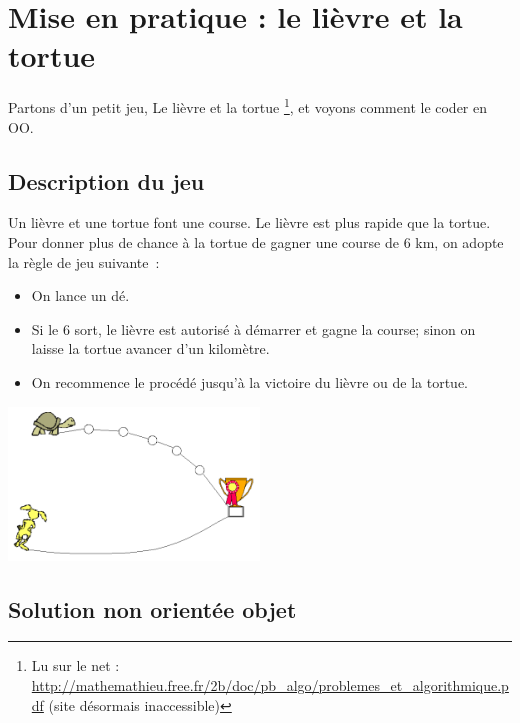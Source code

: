 \clearpage	
\section{Mise en pratique : le lièvre et la tortue}

	Partons d'un petit jeu, \og{}Le lièvre et la tortue\fg{}%
	\footnote{%
		Lu sur le net : 
		\url{http://mathemathieu.free.fr/2b/doc/pb_algo/problemes_et_algorithmique.pdf} (site désormais inaccessible)%
	}, 
	et voyons comment le coder en OO.

	\subsection{Description du jeu}

	\newcommand{\nbMaxKmTortue}{6}
		Un lièvre et une tortue font une course.
		Le lièvre est plus rapide que la tortue.
		Pour donner plus de chance à la tortue de gagner une course de \nbMaxKmTortue{} km, 
		on adopte la règle de jeu suivante~:
		\begin{itemize}
		\item 
			On lance un dé. 
		\item
			Si le 6 sort, 
			le lièvre est autorisé à démarrer et gagne la course; 
			sinon on laisse la tortue avancer d’un kilomètre.
		\item
			On recommence le procédé jusqu'à la victoire du lièvre ou de la tortue.
		\end{itemize}
		
		\begin{center}
			\includegraphics[width=0.5\textwidth]{image/lievre-tortue}
		\end{center}
		
	\subsection{Solution non orientée objet}
	
